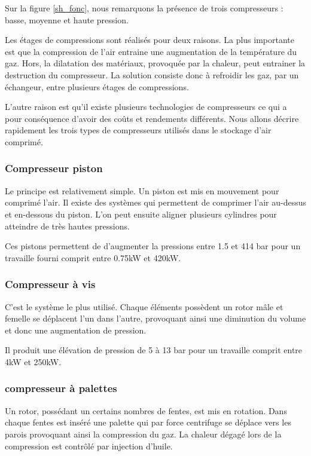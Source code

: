  Sur la figure \ref{sh_fonc}, nous remarquons la présence de trois compresseurs : basse, moyenne et haute pression. 
 
Les étages de compressions sont réalisés pour deux raisons. La plus importante est que la compression de l'air entraine une augmentation de la température du gaz. Hors, la dilatation des matériaux, provoquée par la chaleur, peut entrainer la destruction du compresseur. La solution consiste donc à refroidir les gaz, par un échangeur, entre plusieurs étages de compressions. 

L'autre raison est qu'il existe plusieurs technologies de compresseurs ce qui a pour conséquence d'avoir des coûts et rendements différents. Nous allons décrire rapidement les trois types de compresseurs utilisés dans le stockage d'air comprimé.

\subsubsection{Compresseur piston}

Le principe est relativement simple. Un piston est mis en mouvement pour comprimé l'air. Il existe des systèmes qui permettent de comprimer l'air au-dessus et en-dessous du piston. L'on peut ensuite aligner plusieurs cylindres pour atteindre de très hautes pressions.

Ces pistons permettent de d'augmenter la pressions entre 1.5 et 414 bar pour un travaille fourni comprit entre 0.75kW et 420kW.
 
\subsubsection{Compresseur à vis}

 C'est le système le plus utilisé. Chaque éléments possèdent un rotor mâle et femelle se déplacent l'un dans l'autre, provoquant ainsi une diminution du volume et donc une augmentation de pression.  
 
Il produit une élévation de pression de 5 à 13 bar pour un travaille comprit entre 4kW et 250kW.

\subsubsection{compresseur à palettes}
 
 Un rotor, possédant un certains nombres de fentes, est mis en rotation. Dans chaque fentes est inséré une palette qui par force centrifuge se déplace vers les parois provoquant ainsi la compression du gaz. La chaleur dégagé lors de la compression est contrôlé par injection d'huile.
 
